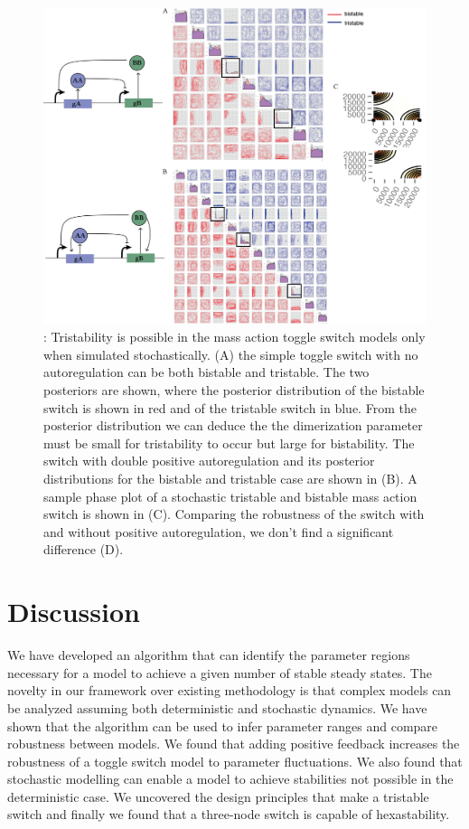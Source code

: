{\begin{figure}[h]
\begin{center}
\includegraphics[scale=0.5]{chapterStabilityFinder/images/MA_stoch_design_princ.png}
\caption[LoF caption]{ \label{fig:fig7}: Tristability is possible in the mass action toggle switch models only when simulated stochastically. (A) the simple toggle switch with no autoregulation can be both bistable and tristable. The two posteriors are shown, where the posterior distribution of the bistable switch is shown in red and of the tristable switch in blue. From the posterior distribution we can deduce the the dimerization parameter must be small for tristability to occur but large for bistability. The switch with double positive autoregulation and its posterior distributions for the bistable and tristable case are shown in (B). A sample phase plot of a stochastic tristable and bistable mass action switch is shown in (C). Comparing the robustness of the switch with and without positive autoregulation, we don't find a significant difference (D).}
\end{center}
\end{figure}

\section{Discussion}




We have developed an algorithm that can identify the parameter regions necessary for a model to achieve a given number of stable steady states. The novelty in our framework over existing methodology is that complex models can be analyzed assuming both deterministic and stochastic dynamics. We have shown that the algorithm can be used to infer parameter ranges and compare robustness between models. We found that adding positive feedback increases the robustness of a toggle switch model to parameter fluctuations. We also found that stochastic modelling can enable a model to achieve stabilities not possible in the deterministic case. We uncovered the design principles that make a tristable switch and finally we found that a three-node switch is capable of hexastability.

}
